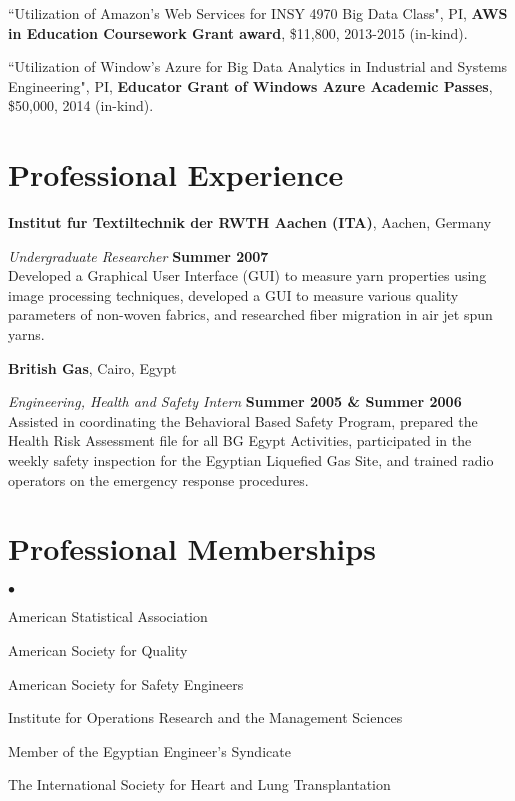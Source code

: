 \documentclass[margin,line]{res}
\newenvironment{list2}{
  \begin{list}{$\bullet$}{%
      \setlength{\itemsep}{0in}
      \setlength{\parsep}{0in} \setlength{\parskip}{0in}
      \setlength{\topsep}{0in} \setlength{\partopsep}{0in} 
      \setlength{\leftmargin}{0.2in}}}{\end{list}}
\begin{document}
\begin{resume}
\vspace{-1.5mm}
``Utilization of Amazon's Web Services for INSY 4970 Big Data Class", PI, \textbf{AWS in Education Coursework Grant award}, \$11,800, 2013-2015 (in-kind).

\vspace{-1.5mm}
``Utilization of Window's Azure for Big Data Analytics in Industrial and Systems Engineering", PI, \textbf{Educator Grant of Windows Azure Academic Passes}, \$50,000, 2014 (in-kind).


\section{\sc Professional Experience}
{\bf Institut fur Textiltechnik der RWTH Aachen (ITA)}, Aachen, Germany

\vspace{-3.5mm}
{\em Undergraduate Researcher} \hfill {\bf Summer 2007}\\
Developed a Graphical User Interface (GUI) to measure yarn properties using image processing techniques, developed a GUI to measure various quality parameters of non-woven fabrics, and researched fiber migration in air jet spun yarns.

\vspace{-2 mm}
{\bf British Gas}, Cairo, Egypt

\vspace{-.35cm}
{\em Engineering, Health and Safety Intern} \hfill {\bf Summer 2005 \& Summer 2006}\\
Assisted in coordinating the Behavioral Based Safety Program, prepared the Health Risk Assessment file for all BG Egypt Activities, participated in the weekly safety inspection for the Egyptian Liquefied Gas Site, and trained radio operators on the emergency response procedures.


\section{\sc Professional Memberships} 
\begin{list2}
	\item American Statistical Association
	\item American Society for Quality 
	\item American Society for Safety Engineers
	\item Institute for Operations Research and the Management Sciences
	\item Member of the Egyptian Engineer's Syndicate
	\item The International Society for Heart and Lung Transplantation
\end{list2}



\end{resume}
\end{document}
